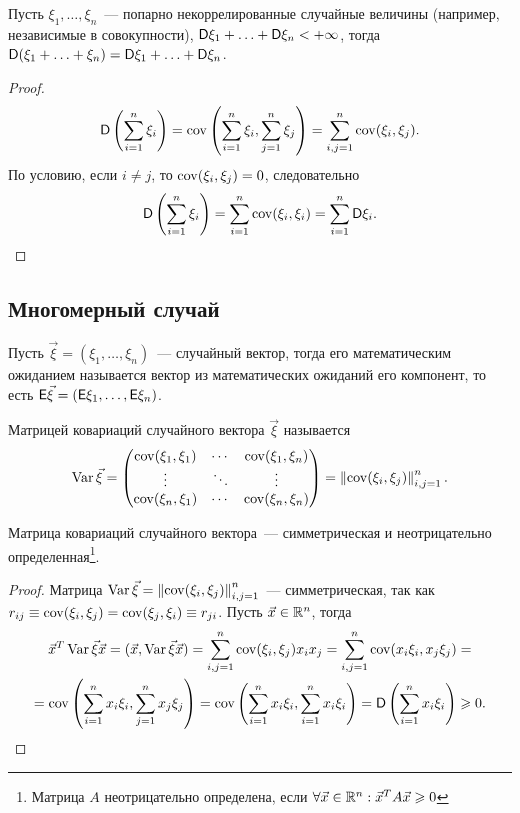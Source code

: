 \begin{lemma}
	Пусть $\xi_1, \ldots, \xi_n$~--- попарно некоррелированные случайные величины (например, независимые в совокупности), $\mathsf{D} \xi_1 + \ldots + \mathsf{D} \xi_n < +\infty$, тогда $\mathsf{D} ( \xi_1 + \ldots + \xi_n ) = \mathsf{D} \xi_1 + \ldots + \mathsf{D} \xi_n$.
	\begin{proof}
		$$\mathsf{D} \left( \sum_{i=1}^n \xi_i \right) = \operatorname{cov} \left( \sum_{i=1}^n \xi_i, \sum_{j=1}^n \xi_j \right) = \sum_{i, j = 1}^n \operatorname{cov} (\xi_i, \xi_j).$$
		По условию, если $i \neq j$, то $\operatorname{cov} (\xi_i, \xi_j) = 0$, следовательно 
		$$\mathsf{D} \left( \sum_{i=1}^n \xi_i \right) = \sum_{i=1}^n \operatorname{cov} (\xi_i, \xi_i) = \sum_{i=1}^n \mathsf{D} \xi_i.$$
	\end{proof}
\end{lemma}

\subsection{Многомерный случай}
\begin{definition}
	Пусть $\vec \xi  = (\xi_1, \ldots, \xi_n )$~--- случайный вектор, тогда его математическим ожиданием называется вектор из математических ожиданий его компонент, то есть $\mathsf{E} \vec \xi = (\mathsf{E} \xi_1, \ldots, \mathsf{E} \xi_n)$.
\end{definition}
\begin{definition}
	Матрицей ковариаций случайного вектора $\vec \xi$ называется 
	$$ \operatorname{Var} \vec \xi = \begin{pmatrix}
		\operatorname{cov} ( \xi_1, \xi_1) & \cdots & \operatorname{cov} (\xi_1, \xi_n)\\
		\vdots  & \ddots & \vdots\\
		\operatorname{cov} ( \xi_n, \xi_1) & \cdots & \operatorname{cov} (\xi_n, \xi_n)
	\end{pmatrix} = \left\| \operatorname{cov} (\xi_i, \xi_j ) \right\|_{i, j = 1}^n.$$
\end{definition}

\begin{lemma}
	Матрица ковариаций случайного вектора~--- симметрическая и неотрицательно определенная\footnote{Матрица $A$ неотрицательно определена, если $\forall \vec x \in \mathbb{R}^n: {\vec x}^T A \vec x \geqslant 0$}.
	\begin{proof}
		Матрица $\operatorname{Var} \vec \xi = \left\| \operatorname{cov} (\xi_i, \xi_j ) \right\|_{i, j = 1}^n$~--- симметрическая, так как $r_{ij} \equiv \operatorname{cov} ( \xi_i, \xi_j ) = \operatorname{cov} (\xi_j, \xi_i) \equiv r_{ji}$. Пусть $\vec x \in \mathbb{R}^n$, тогда 
		\begin{multline*}
			{\vec x}^T \operatorname{Var} \vec \xi \vec x = ( \vec x, \operatorname{Var} \vec \xi \vec x ) = \sum_{i,j=1}^n \operatorname{cov} (\xi_i, \xi_j ) x_i x_j = \sum_{i,j=1}^n \operatorname{cov} (x_i \xi_i, x_j \xi_j) =\\ = \operatorname{cov} \left( \sum_{i=1}^n  x_i \xi_i, \sum_{j=1}^n x_j \xi_j \right) = \operatorname{cov} \left( \sum_{i=1}^n  x_i \xi_i, \sum_{i=1}^n x_i \xi_i \right) =\mathsf{D} \left( \sum_{i=1}^n x_i \xi_i \right) \geqslant 0.
		\end{multline*}
	\end{proof}
\end{lemma}


